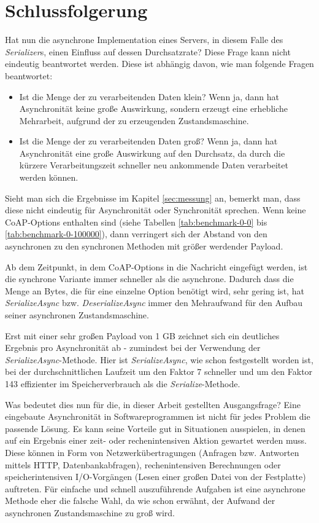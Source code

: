 \section{Schlussfolgerung}
\label{sec:schlussfolgerung}

Hat nun die asynchrone Implementation eines Servers, in diesem Falle des \textit{Serializer}s, einen Einfluss auf dessen Durchsatzrate? Diese Frage kann nicht eindeutig beantwortet werden. Diese ist abhängig davon, wie man folgende Fragen beantwortet:
\begin{itemize}
    \item Ist die Menge der zu verarbeitenden Daten klein? Wenn ja, dann hat Asynchronität keine große Auswirkung, sondern erzeugt eine erhebliche Mehrarbeit, aufgrund der zu erzeugenden Zustandsmaschine.
    \item Ist die Menge der zu verarbeitenden Daten groß? Wenn ja, dann hat Asynchronität eine große Auswirkung auf den Durchsatz, da durch die kürzere Verarbeitungszeit schneller neu ankommende Daten verarbeitet werden können.
\end{itemize}

Sieht man sich die Ergebnisse im Kapitel \ref{sec:messung} an, bemerkt man, dass diese nicht eindeutig für Asynchronität oder Synchronität sprechen. Wenn keine CoAP-Options enthalten sind (siehe Tabellen \ref{tab:benchmark-0-0} bis \ref{tab:benchmark-0-100000}), dann verringert sich der Abstand von den asynchronen zu den synchronen Methoden mit größer werdender Payload.

Ab dem Zeitpunkt, in dem CoAP-Options in die Nachricht eingefügt werden, ist die synchrone Variante immer schneller als die asynchrone. Dadurch dass die Menge an Bytes, die für eine einzelne Option benötigt wird, sehr gering ist, hat \textit{SerializeAsync} bzw. \textit{DeserializeAsync} immer den Mehraufwand für den Aufbau seiner asynchronen Zustandsmaschine.

Erst mit einer sehr großen Payload von 1 GB zeichnet sich ein deutliches Ergebnis pro Asynchronität ab - zumindest bei der Verwendung der \textit{SerializeAsync}-Methode. Hier ist \textit{SerializeAsync}, wie schon festgestellt worden ist, bei der durchschnittlichen Laufzeit um den Faktor 7 schneller und um den Faktor 143 effizienter im Speicherverbrauch als die \textit{Serialize}-Methode. 

Was bedeutet dies nun für die, in dieser Arbeit gestellten Ausgangsfrage? Eine eingebaute Asynchronität in Softwareprogrammen ist nicht für jedes Problem die passende Lösung. Es kann seine Vorteile gut in Situationen ausspielen, in denen auf ein Ergebnis einer zeit- oder rechenintensiven Aktion gewartet werden muss. Diese können in Form von Netzwerkübertragungen (Anfragen bzw. Antworten mittels HTTP, Datenbankabfragen), rechenintensiven Berechnungen oder speicherintensiven I/O-Vorgängen (Lesen einer großen Datei von der Festplatte) auftreten. Für einfache und schnell auszuführende Aufgaben ist eine asynchrone Methode eher die falsche Wahl, da wie schon erwähnt, der Aufwand der asynchronen Zustandsmaschine zu groß wird.

